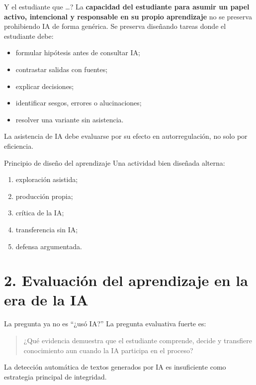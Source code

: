 \documentclass[
  ignorenonframetext,
  aspectratio=169,
  spanish,
]{beamer}
\providecommand{\tightlist}{%
  \setlength{\itemsep}{0pt}\setlength{\parskip}{0pt}}
\begin{document}
\begin{frame}{Y el estudiante que \ldots?}
\protect{}\label{y-el-estudiante-que}
La \textbf{capacidad del estudiante para asumir un papel activo,
intencional y responsable en su propio aprendizaje} no se preserva
prohibiendo IA de forma genérica. Se preserva diseñando tareas donde el
estudiante debe:

\begin{itemize}
\tightlist
\item
  formular hipótesis antes de consultar IA;
\item
  contrastar salidas con fuentes;
\item
  explicar decisiones;
\item
  identificar sesgos, errores o alucinaciones;
\item
  resolver una variante sin asistencia.
\end{itemize}

La asistencia de IA debe evaluarse por su efecto en autorregulación, no
solo por eficiencia.
\end{frame}

\begin{frame}{Principio de diseño del aprendizaje}
\protect{}\label{principio-de-diseuxf1o-del-aprendizaje}
Una actividad bien diseñada alterna:

\begin{enumerate}
\tightlist
\item
  exploración asistida;
\item
  producción propia;
\item
  crítica de la IA;
\item
  transferencia sin IA;
\item
  defensa argumentada.
\end{enumerate}
\end{frame}

\section{2. Evaluación del aprendizaje en la era de la
IA}\label{evaluaciuxf3n-del-aprendizaje-en-la-era-de-la-ia}

\begin{frame}{La pregunta ya no es ``¿usó IA?''}
\protect{}\label{la-pregunta-ya-no-es-usuxf3-ia}
La pregunta evaluativa fuerte es:

\begin{quote}
¿Qué evidencia demuestra que el estudiante comprende, decide y
transfiere conocimiento aun cuando la IA participa en el proceso?
\end{quote}

La detección automática de textos generados por IA es insuficiente como
estrategia principal de integridad.
\end{frame}
\end{document}
